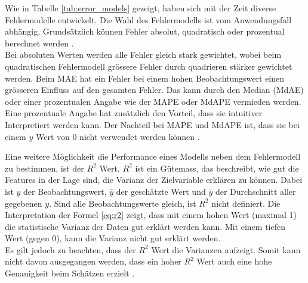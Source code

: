 \begin{table}[h]
\centering
{}
\caption{Fehlermodelle mit Formelen}
\label{tab:error_models}
\end{table}

Wie in Tabelle \ref{tab:error_models} gezeigt, haben sich mit der Zeit diverse Fehlermodelle entwickelt. Die Wahl des Fehlermodells ist vom Anwendungsfall abhängig. Grundsätzlich können Fehler absolut, quadratisch oder prozentual berechnet werden \cite{error_models}.\\
Bei absoluten Werten werden alle Fehler gleich stark gewichtet, wobei beim quadratischen Fehlermodell grössere Fehler durch quadrieren stärker gewichtet werden. Beim MAE hat ein Fehler bei einem hohen Beobachtungswert einen grösseren Einfluss auf den gesamten Fehler. Das kann durch den Median (MdAE) oder einer prozentualen Angabe wie der MAPE oder MdAPE vermieden werden. Eine prozentuale Angabe hat zusätzlich den Vorteil, dass sie intuitiver Interpretiert werden kann. Der Nachteil bei MAPE und MdAPE ist, dass sie bei einem $y$ Wert von 0 nicht verwendet werden können \cite{error_models_2}.

Eine weitere Möglichkeit die Performance eines Modells neben dem Fehlermodell zu bestimmen, ist der $R^2$ Wert. $R^2$ ist ein Gütemass, das beschreibt, wie gut die Features in der Lage sind, die Varianz der Zielvariable erklären zu können. Dabei ist $y$ der Beobachtungswert, $\hat{y}$ der geschätzte Wert und $\overline{y}$ der Durchschnitt aller gegebenen $y$. Sind alle Beobachtungswerte gleich, ist $R^2$ nicht definiert. Die Interpretation der Formel \eqref{eq:r2} zeigt, dass mit einem hohen Wert (maximal 1) die statistische Varianz der Daten gut erklärt werden kann. Mit einem tiefen Wert (gegen 0), kann die Varianz nicht gut erklärt werden. \\
Es gilt jedoch zu beachten, dass der $R^2$ Wert die Varianzen aufzeigt. Somit kann nicht davon ausgegangen werden, dass ein hoher $R^2$ Wert auch eine hohe Genauigkeit beim Schätzen erzielt \cite{r2, r2_2}.

